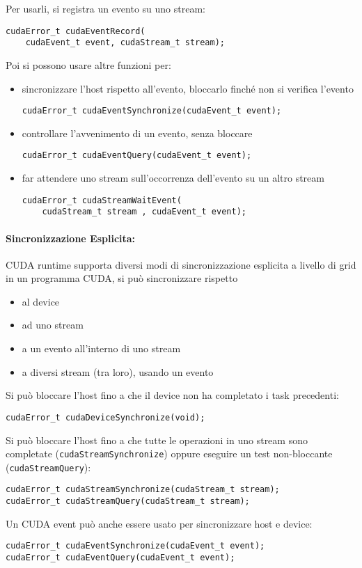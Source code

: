 Per usarli, si registra un evento su uno stream:
\begin{verbatim}
cudaError_t cudaEventRecord(
    cudaEvent_t event, cudaStream_t stream);
\end{verbatim}

Poi si possono usare altre funzioni per:
\begin{itemize}
	\item sincronizzare l'host rispetto all'evento, bloccarlo finché non si verifica l'evento
	\begin{verbatim}
cudaError_t cudaEventSynchronize(cudaEvent_t event);
	\end{verbatim}
	
	\item controllare l'avvenimento di un evento, senza bloccare
	\begin{verbatim}
cudaError_t cudaEventQuery(cudaEvent_t event);
	\end{verbatim}
	
	\item far attendere uno stream sull'occorrenza dell'evento su un altro stream
	\begin{verbatim}
cudaError_t cudaStreamWaitEvent(
    cudaStream_t stream , cudaEvent_t event);
	\end{verbatim}
\end{itemize}

\paragraph{Sincronizzazione Esplicita:} CUDA runtime supporta diversi modi di sincronizzazione esplicita a livello di grid in un programma CUDA, si può sincronizzare rispetto
\begin{itemize}
	\item al device
	
	\item ad uno stream
	
	\item a un evento all'interno di uno stream
	
	\item a diversi stream (tra loro), usando un evento
\end{itemize}

Si può bloccare l'host fino a che il device non ha completato i task precedenti:
\begin{verbatim}
cudaError_t cudaDeviceSynchronize(void);
\end{verbatim}

Si può bloccare l'host fino a che tutte le operazioni in uno stream sono completate (\texttt{cudaStreamSynchronize}) oppure eseguire un test non-bloccante (\texttt{cudaStreamQuery}):
\begin{verbatim}
cudaError_t cudaStreamSynchronize(cudaStream_t stream);
cudaError_t cudaStreamQuery(cudaStream_t stream);
\end{verbatim}

Un CUDA event può anche essere usato per sincronizzare host e device:
\begin{verbatim}
cudaError_t cudaEventSynchronize(cudaEvent_t event);
cudaError_t cudaEventQuery(cudaEvent_t event);
\end{verbatim}

